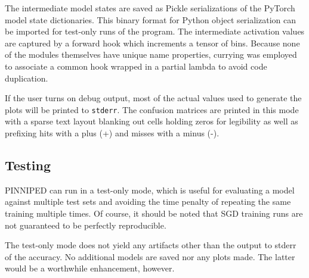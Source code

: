 \documentclass[10pt,epsf]{article}
\begin{document}
{{    The intermediate model states are saved as Pickle serializations of the PyTorch model state dictionaries.
    This binary format for Python object serialization can be imported for test-only runs of the program.
    The intermediate activation values are captured by a forward hook\autocite{torchactivations}
    which increments a tensor\autocite{torchtensors} of bins. Because none of the modules themselves
    have unique name properties, currying\autocite{functools} was employed to associate a common hook
    wrapped in a partial lambda to avoid code duplication.

    If the user turns on debug output, most of the actual values used to generate the plots will be printed
    to \texttt{stderr}. The confusion matrices are printed in this mode with a sparse text layout blanking
    out cells holding zeros for legibility as well as prefixing hits with a plus (+) and misses with a minus (-).
  }
  \subsection{Testing}{
    PINNIPED can run in a test-only mode, which is useful for evaluating a model against multiple test sets
    and avoiding the time penalty of repeating the same training multiple times. Of course, it should be noted
    that SGD training runs are not guaranteed to be perfectly reproducible.

    The test-only mode does not yield any artifacts other than the output to stderr of the accuracy. No
    additional models are saved nor any plots made. The latter would be a worthwhile enhancement, however.
  }
}
\end{document}
